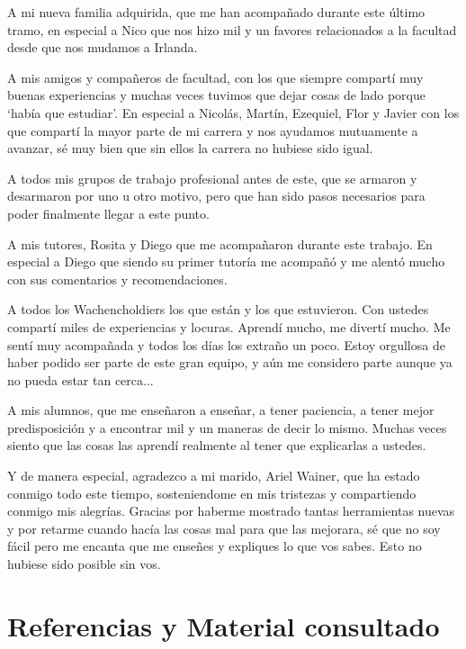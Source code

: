 \documentclass[a4paper]{article}
\begin{document}
A mi nueva familia adquirida, que me han acompañado durante este último tramo, en especial a Nico que nos hizo mil y un favores relacionados a la facultad desde que nos mudamos a Irlanda.

A mis amigos y compañeros de facultad, con los que siempre compartí muy buenas experiencias y muchas veces tuvimos que dejar cosas de lado porque `había que estudiar'. En especial a Nicolás, Martín, Ezequiel, Flor y Javier con los que compartí la mayor parte de mi carrera y nos ayudamos mutuamente a avanzar, sé muy bien que sin ellos la carrera no hubiese sido igual.

A todos mis grupos de trabajo profesional antes de este, que se armaron y desarmaron por uno u otro motivo, pero que han sido pasos necesarios para poder finalmente llegar a este punto.

A mis tutores, Rosita y Diego que me acompañaron durante este trabajo. En especial a Diego que siendo su primer tutoría me acompañó y me alentó mucho con sus comentarios y recomendaciones.

A todos los Wachencholdiers los que están y los que estuvieron. Con ustedes compartí miles de experiencias y locuras. Aprendí mucho, me divertí mucho. Me sentí muy acompañada y todos los días los extraño un poco. Estoy orgullosa de haber podido ser parte de este gran equipo, y aún me considero parte aunque ya no pueda estar tan cerca...

A mis alumnos, que me enseñaron a enseñar, a tener paciencia, a tener mejor predisposición y a encontrar mil y un maneras de decir lo mismo. Muchas veces siento que las cosas las aprendí realmente al tener que explicarlas a ustedes.

Y de manera especial, agradezco a mi marido, Ariel Wainer, que ha estado conmigo todo este tiempo, sosteniendome en mis tristezas y compartiendo conmigo mis alegrías. Gracias por haberme mostrado tantas herramientas nuevas y por retarme cuando hacía las cosas mal para que las mejorara, sé que no soy fácil pero me encanta que me enseñes y expliques lo que vos sabes. Esto no hubiese sido posible sin vos.


\newpage
\section{Referencias y Material consultado}

\renewcommand\refname{\small}
\end{document}
